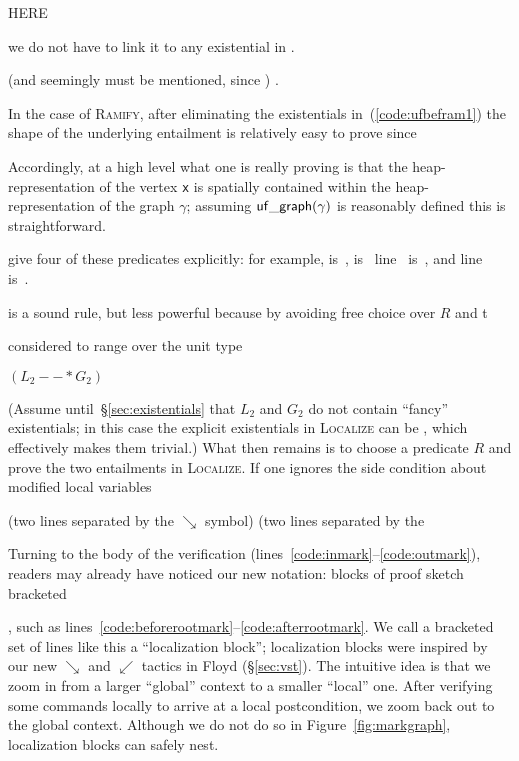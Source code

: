 HERE

we do not have to link it to any existential in .

(and seemingly must be mentioned, since ) .

In the case of \textsc{Ramify},
after eliminating the existentials in~(\ref{code:ufbefram1}) the shape of the underlying entailment is relatively easy to prove since 

  Accordingly, at a high level what one is really proving is that the heap-representation of the vertex \texttt{x} is spatially contained within the heap-representation of the graph $\gamma$; assuming $\mathsf{uf\_graph}(\gamma)$ is reasonably defined this is straightforward.





give four of these predicates explicitly: for example,  is~,  is~ line~ is~, and line~ is~.


is a sound rule, but less powerful because by avoiding free choice over $R$ and t


considered to range over the unit type

$(L_2 --* G_2)$



(Assume until~\S\ref{sec:existentials} that $L_2$ and $G_2$ do not contain ``fancy'' existentials; in this case the explicit existentials in \textsc{Localize} can be ,
which effectively makes them trivial.)  What then remains is to choose a predicate $R$ and prove the two entailments in \textsc{Localize}.  If one ignores the side condition about modified local variables

(two lines separated by the $\searrow$ symbol) 
 (two lines separated by the

Turning to the body of the verification (lines~\ref{code:inmark}--\ref{code:outmark}), readers may already have noticed our new notation: blocks of proof sketch bracketed 

, such as lines~\ref{code:beforerootmark}--\ref{code:afterrootmark}.  We call a bracketed set of lines like this a ``localization block''; localization blocks were inspired by our new  $\searrow$ and  $\swarrow$ tactics in Floyd (\S\ref{sec:vst}).
The intuitive idea is that we zoom in from a larger ``global'' context to a smaller ``local'' one.  After verifying some commands locally to arrive at a local postcondition, we zoom back out to the global context.  Although we do not do so in Figure~\ref{fig:markgraph}, localization blocks can safely nest.


